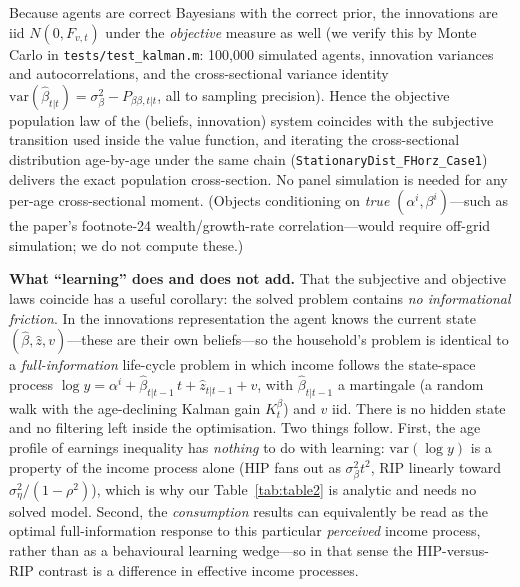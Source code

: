 \documentclass[11pt,fleqn]{article}
\begin{document}
Because agents are correct Bayesians with the correct prior, the innovations are iid
$N(0,F_{v,t})$ under the \emph{objective} measure as well (we verify this by Monte
Carlo in \texttt{tests/test\_kalman.m}: 100{,}000 simulated agents, innovation
variances and autocorrelations, and the cross-sectional variance identity
$\mathrm{var}(\hat{\beta}_{t|t})=\sigma^2_\beta-P_{\beta\beta,t|t}$, all to sampling
precision). Hence the objective population law of the (beliefs, innovation) system
coincides with the subjective transition used inside the value function, and
iterating the cross-sectional distribution age-by-age under the same chain
(\texttt{StationaryDist\_FHorz\_Case1}) delivers the exact population cross-section.
No panel simulation is needed for any per-age cross-sectional moment. (Objects
conditioning on \emph{true} $(\alpha^i,\beta^i)$---such as the paper's footnote-24
wealth/growth-rate correlation---would require off-grid simulation; we do not compute
these.)

\textbf{What ``learning'' does and does not add.} That the subjective and objective laws
coincide has a useful corollary: the solved problem contains \emph{no informational
friction}. In the innovations representation the agent knows the current state
$(\hat\beta,\hat z,v)$---these are their own beliefs---so the household's problem is
identical to a \emph{full-information} life-cycle problem in which income follows the
state-space process $\log y=\alpha^i+\hat\beta_{t|t-1}\,t+\hat z_{t|t-1}+v$, with
$\hat\beta_{t|t-1}$ a martingale (a random walk with the age-declining Kalman gain
$K^\beta_t$) and $v$ iid. There is no hidden state and no filtering left inside the
optimisation. Two things follow. First, the age profile of earnings inequality has
\emph{nothing} to do with learning: $\mathrm{var}(\log y)$ is a property of the income
process alone (HIP fans out as $\sigma^2_\beta t^2$, RIP linearly toward
$\sigma^2_\eta/(1-\rho^2)$), which is why our Table~\ref{tab:table2} is analytic and needs
no solved model. Second, the \emph{consumption} results can equivalently be read as the
optimal full-information response to this particular \emph{perceived} income process,
rather than as a behavioural learning wedge---so in that sense the HIP-versus-RIP contrast
is a difference in effective income processes.
\end{document}
